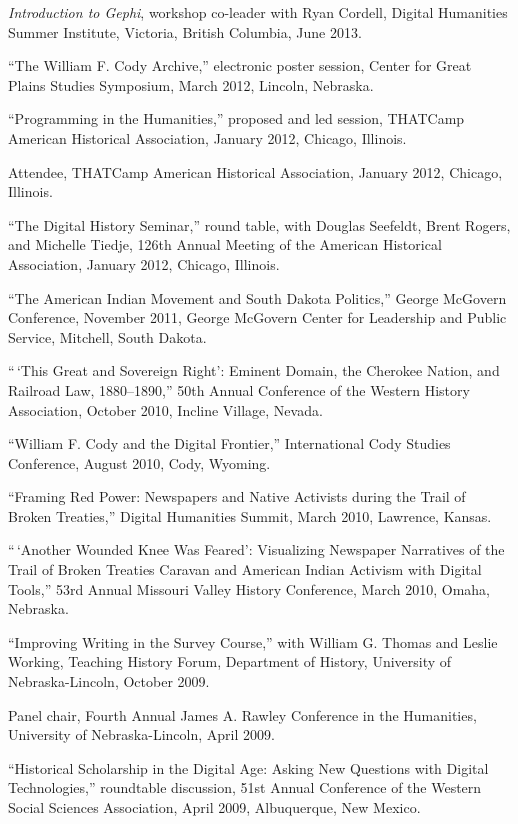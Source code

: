 \emph{Introduction to Gephi}, workshop co-leader with Ryan Cordell,
Digital Humanities Summer Institute, Victoria, British Columbia, June
2013.

``The William F. Cody Archive,'' electronic poster session, Center for
Great Plains Studies Symposium, March 2012, Lincoln, Nebraska.

``Programming in the Humanities,'' proposed and led session, THATCamp
American Historical Association, January 2012, Chicago, Illinois.

Attendee, THATCamp American Historical Association, January 2012,
Chicago, Illinois.

``The Digital History Seminar,'' round table, with Douglas Seefeldt,
Brent Rogers, and Michelle Tiedje, 126th Annual Meeting of the American
Historical Association, January 2012, Chicago, Illinois.

``The American Indian Movement and South Dakota Politics,'' George
McGovern Conference, November 2011, George McGovern Center for
Leadership and Public Service, Mitchell, South Dakota.

``\,`This Great and Sovereign Right': Eminent Domain, the Cherokee
Nation, and Railroad Law, 1880--1890,'' 50th Annual Conference of the
Western History Association, October 2010, Incline Village, Nevada.

``William F. Cody and the Digital Frontier,'' International Cody Studies
Conference, August 2010, Cody, Wyoming.

``Framing Red Power: Newspapers and Native Activists during the Trail of
Broken Treaties,'' Digital Humanities Summit, March 2010, Lawrence,
Kansas.

``\,`Another Wounded Knee Was Feared': Visualizing Newspaper Narratives
of the Trail of Broken Treaties Caravan and American Indian Activism
with Digital Tools,'' 53rd Annual Missouri Valley History Conference,
March 2010, Omaha, Nebraska.

``Improving Writing in the Survey Course,'' with William G. Thomas and
Leslie Working, Teaching History Forum, Department of History,
University of Nebraska-Lincoln, October 2009.

Panel chair, Fourth Annual James A. Rawley Conference in the Humanities,
University of Nebraska-Lincoln, April 2009.

``Historical Scholarship in the Digital Age: Asking New Questions with
Digital Technologies,'' roundtable discussion, 51st Annual Conference of
the Western Social Sciences Association, April 2009, Albuquerque, New
Mexico.

